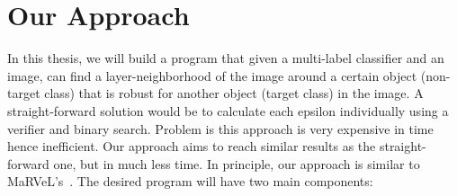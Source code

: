 \documentclass[11pt]{article}
\begin{document}
\section{Our Approach}

In this thesis, we will build a program that given a multi-label classifier and an image, can find a layer-neighborhood of the image around a certain object (non-target class) that is robust for another object (target class) in the image.
A straight-forward solution would be to calculate each epsilon individually using a verifier and binary search.
Problem is this approach is very expensive in time hence inefficient.
Our approach aims to reach similar results as the straight-forward one, but in much less time.
In principle, our approach is similar to MaRVeL's~\cite{MARVEL}.
The desired program will have two main components:
\end{document}
